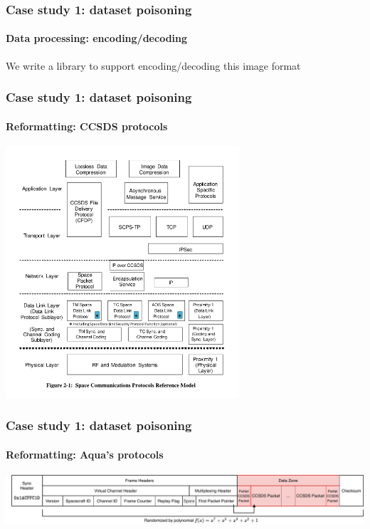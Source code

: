 \documentclass{beamer}
\begin{document}
\begin{frame}
  \frametitle{Case study 1: dataset poisoning}
  \framesubtitle{Data processing: encoding/decoding}

  We write a library to support encoding/decoding this image format
\end{frame}


\begin{frame}
  \frametitle{Case study 1: dataset poisoning}
  \framesubtitle{Reformatting: CCSDS protocols}
  \centering
  \includegraphics[width=0.65\textwidth]{images/protocols.png}
\end{frame}

\begin{frame}
  \frametitle{Case study 1: dataset poisoning}
  \framesubtitle{Reformatting: Aqua's protocols}
  \includegraphics[width=\textwidth]{images/cadu_diagram.pdf}
\end{frame}
\end{document}
